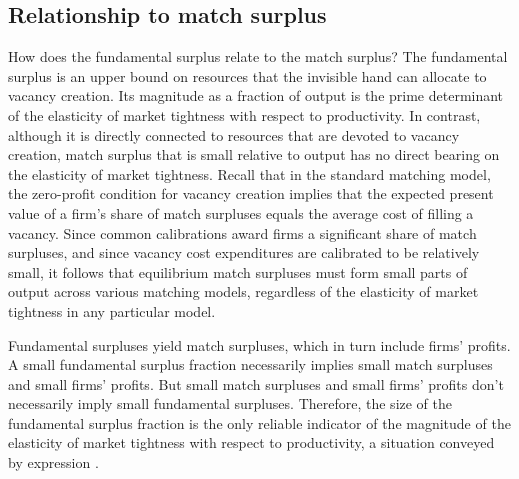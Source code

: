 
\subsection{Relationship to match surplus}
How does the fundamental surplus relate to the match surplus?
The fundamental
surplus is an upper bound on resources that the invisible hand
can allocate to vacancy creation.  Its magnitude as a
fraction of output is the prime determinant of the
elasticity of market tightness with respect to productivity.
In contrast, although it
is directly connected to resources that are
devoted to vacancy creation,  match surplus that is small
relative to output
has no direct bearing on the elasticity of market tightness.
Recall that in the standard matching model, the zero-profit
condition for vacancy creation implies that the expected present
value of a firm's share of match surpluses  equals
the average cost of filling a vacancy. Since common
calibrations award firms a significant share of
match surpluses,  and since vacancy cost expenditures are calibrated
to be relatively small,
it follows that
equilibrium match surpluses must form  small parts of output
across various matching models, regardless of the elasticity
of market tightness in any particular model.

Fundamental surpluses yield match surpluses, which in turn include
firms' profits.
A small fundamental surplus
fraction necessarily implies small match surpluses and small firms' profits.
But small match surpluses and small firms' profits don't necessarily  imply
small fundamental surpluses. Therefore,   the size of the fundamental surplus fraction
is the only reliable indicator
of  the magnitude
of the elasticity of market tightness with respect to productivity, a situation  conveyed by expression .






